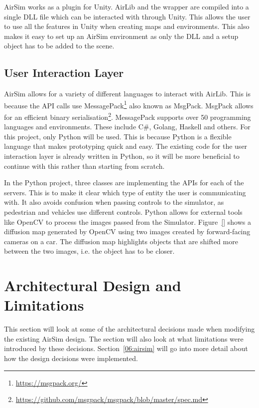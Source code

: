 AirSim works as a plugin for Unity. AirLib and the wrapper are compiled into a single DLL file which can be interacted with through Unity. This allows the user to use all the features in Unity when creating maps and environments. This also makes it easy to set up an AirSim environment as only the DLL and a setup object has to be added to the scene.  


\subsection{User Interaction Layer} \label{05:UIL}
AirSim allows for a variety of different languages to interact with AirLib. This is because the API calls use MessagePack\footnote{\url{https://msgpack.org/}} also known as MsgPack. MsgPack allows for an efficient binary serialisation\footnote{\url{https://github.com/msgpack/msgpack/blob/master/spec.md}}. MessagePack supports over 50 programming languages and environments. These include C\#, Golang, Haskell and others.  For this project, only Python will be used. This is because Python is a flexible language that makes prototyping quick and easy. The existing code for the user interaction layer is already written in Python, so it will be more beneficial to continue with this rather than starting from scratch.

In the Python project, three classes are implementing the APIs for each of the servers. This is to make it clear which type of entity the user is communicating with. It also avoids confusion when passing controls to the simulator, as pedestrian and vehicles use different controls. Python allows for external tools like OpenCV to process the images passed from the Simulator. Figure~\ref{} shows a diffusion map generated by OpenCV using two images created by forward-facing cameras on a car. The diffusion map highlights objects that are shifted more between the two images, i.e. the object has to be closer. 


\section{Architectural Design and Limitations} \label{05:ArchitecturalDesign}
This section will look at some of the architectural decisions made when modifying the existing AirSim design. The section will also look at what limitations were introduced by these decisions. Section~\ref{06:airsim} will go into more detail about how the design decisions were implemented. 


